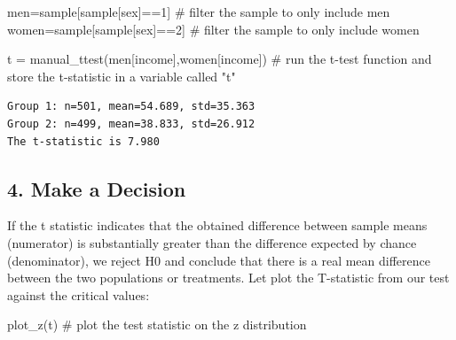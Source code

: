 \documentclass[
  letterpaper,
  DIV=11,
  numbers=noendperiod]{scrreprt}
\newenvironment{Shaded}{\begin{snugshade}}{\end{snugshade}}
\newcommand{\CommentTok}[1]{\textcolor[rgb]{0.37,0.37,0.37}{#1}}
\newcommand{\DecValTok}[1]{\textcolor[rgb]{0.68,0.00,0.00}{#1}}
\newcommand{\NormalTok}[1]{\textcolor[rgb]{0.00,0.23,0.31}{#1}}
\newcommand{\OperatorTok}[1]{\textcolor[rgb]{0.37,0.37,0.37}{#1}}
\newcommand{\StringTok}[1]{\textcolor[rgb]{0.13,0.47,0.30}{#1}}
\begin{document}
\begin{Shaded}
\begin{Highlighting}[]
\NormalTok{men}\OperatorTok{=}\NormalTok{sample[sample[}\StringTok{\textquotesingle{}sex\textquotesingle{}}\NormalTok{]}\OperatorTok{==}\DecValTok{1}\NormalTok{] }\CommentTok{\# filter the sample to only include men}
\NormalTok{women}\OperatorTok{=}\NormalTok{sample[sample[}\StringTok{\textquotesingle{}sex\textquotesingle{}}\NormalTok{]}\OperatorTok{==}\DecValTok{2}\NormalTok{] }\CommentTok{\# filter the sample to only include women}

\NormalTok{t }\OperatorTok{=}\NormalTok{ manual\_ttest(men[}\StringTok{\textquotesingle{}income\textquotesingle{}}\NormalTok{],women[}\StringTok{\textquotesingle{}income\textquotesingle{}}\NormalTok{]) }\CommentTok{\# run the t{-}test function and store the t{-}statistic in a variable called "t"}
\end{Highlighting}
\end{Shaded}

\begin{verbatim}
Group 1: n=501, mean=54.689, std=35.363
Group 2: n=499, mean=38.833, std=26.912
The t-statistic is 7.980
\end{verbatim}

\hypertarget{make-a-decision}{%
\subsection{4. Make a Decision}\label{make-a-decision}}

If the t statistic indicates that the obtained difference between sample
means (numerator) is substantially greater than the difference expected
by chance (denominator), we reject H0 and conclude that there is a real
mean difference between the two populations or treatments. Let plot the
T-statistic from our test against the critical values:

\begin{Shaded}
\begin{Highlighting}[]
\NormalTok{plot\_z(t) }\CommentTok{\# plot the test statistic on the z distribution}
\end{Highlighting}
\end{Shaded}
\end{document}
